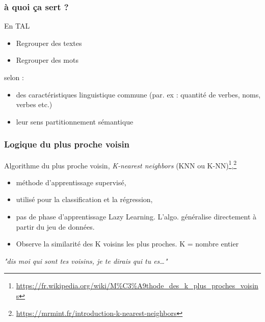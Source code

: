 \begin{frame}
  \frametitle{à quoi ça sert ?}
  En TAL
 \begin{itemize}
  \item {} Regrouper des textes
  \item {} Regrouper des mots 
  \end{itemize}
  
   selon :
  \begin{itemize}
  \item {} des caractéristiques linguistique commune (par. ex : quantité de verbes, noms, verbes etc.)
  \item {} leur sens  partitionnement sémantique
  \end{itemize}

\end{frame}

\begin{frame}
  \frametitle{Logique du plus proche voisin}
  Algorithme du plus proche voisin, \textit{K-nearest neighbors} (KNN ou K-NN)\footnote{\url{https://fr.wikipedia.org/wiki/M\%C3\%A9thode_des_k_plus_proches_voisins}},\footnote{\url{https://mrmint.fr/introduction-k-nearest-neighbors}}
  \begin{itemize}
  \item {} méthode d’apprentissage supervisé,
  \item {} utilisé pour la classification et la régression,
  \item {} pas de phase d’apprentissage  Lazy Learning. L'algo. généralise directement à partir du jeu de données.
  \item {} Observe la similarité des K voisins les plus proches. K = nombre entier
  \end{itemize}
    \textit{"dis moi qui sont tes voisins, je te dirais qui tu es…"}
\end{frame}

